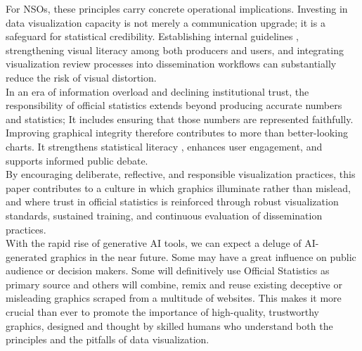 \documentclass[11pt,twoside,a4paper]{article}
\begin{document}
For NSOs, these principles carry concrete operational implications. Investing in data visualization capacity is not merely a communication upgrade; it is a safeguard for statistical credibility. Establishing internal guidelines \citep{wong2013}, strengthening visual literacy among both producers and users, and integrating visualization review processes into dissemination workflows can substantially reduce the risk of visual distortion. \\

In an era of information overload and declining institutional trust, the responsibility of official statistics extends beyond producing accurate numbers and statistics; It includes ensuring that those numbers are represented faithfully. Improving graphical integrity therefore contributes to more than better-looking charts. It strengthens statistical literacy \citep{sabbati2022Literacy}, enhances user engagement, and supports informed public debate. \\

By encouraging deliberate, reflective, and responsible visualization practices, this paper contributes to a culture in which graphics illuminate rather than mislead, and where trust in official statistics is reinforced through robust visualization standards, sustained training, and continuous evaluation of dissemination practices.\\

With the rapid rise of generative AI tools, we can expect a deluge of AI-generated graphics in the near future. Some may have a great influence on public audience or decision makers. Some will definitively use Official Statistics as primary source and others will combine, remix and reuse existing deceptive or misleading graphics scraped from a multitude of websites. This makes it more crucial than ever to promote the importance of high-quality, trustworthy graphics, designed and thought by skilled humans who understand both the principles and the pitfalls of data visualization.

\newpage


\end{document}
